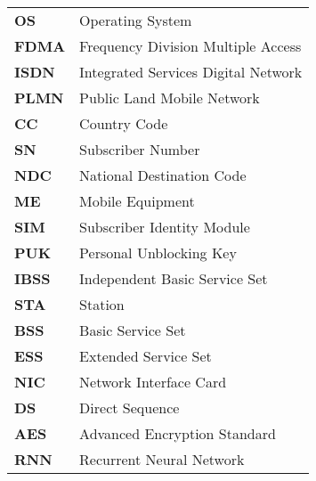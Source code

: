 \begin{tabular}{p{3cm}l}
\textbf{OS}			& Operating System\\
\textbf{FDMA}		& Frequency Division Multiple Access \\
\textbf{ISDN}		& Integrated Services Digital Network \\
 \textbf{PLMN}		& Public Land Mobile Network \\
 \textbf{CC}		& Country Code \\
\textbf{SN}			& Subscriber Number \\
\textbf{NDC}		& National Destination Code\\ 
\textbf{ME}			& Mobile Equipment \\
\textbf{SIM}		& Subscriber Identity Module\\ 
\textbf{PUK}		& Personal Unblocking Key\\
\textbf{IBSS}		& Independent Basic Service Set\\ 
\textbf{STA}		& Station \\
\textbf{BSS}		& Basic Service Set \\
\textbf{ESS}		& Extended Service Set \\
\textbf{NIC}		& Network Interface Card \\
\textbf{DS}			& Direct Sequence \\
\textbf{AES}		& Advanced Encryption Standard \\
\textbf{RNN}		& Recurrent Neural Network\\
\end{tabular}

